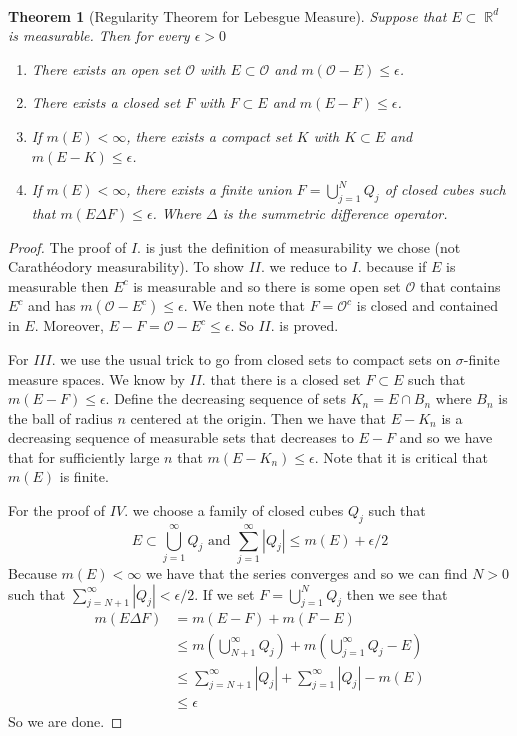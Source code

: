 \documentclass{article}
\DeclareMathOperator{\R}{\mathbb{R}}
\newtheorem*{thm}{\\ Theorem}
\begin{document}
\begin{thm}[Regularity Theorem for Lebesgue Measure]
  Suppose that $E \subset \R^d$ is measurable. Then for every $\epsilon > 0$
  \begin{enumerate}
  \item[I.] There exists an open set $\mathcal{O}$ with $E
    \subset \mathcal{O}$ and $m(\mathcal{O} - E) \leq \epsilon$.
  \item[II.] There exists a closed set $F$ with $F \subset E$ and $m(E-F)
    \leq \epsilon$.
  \item[III.] If $m(E) < \infty$, there exists a compact set $K$ with $K
    \subset E$ and $m(E-K) \leq \epsilon$.
  \item[IV.] If $m(E) < \infty$, there exists a finite union $F =
    \bigcup_{j=1}^N Q_j$ of closed cubes such that $m(E\Delta F) \leq
    \epsilon$. Where $\Delta$ is the summetric difference operator.
  \end{enumerate}
\end{thm}
\begin{proof}
  The proof of $I.$ is just the definition of measurability we chose (not
  Carath\'{e}odory measurability). To show $II.$ we reduce to $I.$
  because if $E$ is measurable then $E^c$ is measurable and so there is some
  open set $\mathcal{O}$ that contains $E^c$ and has $m(\mathcal{O}-E^c)\leq
  \epsilon$. We then note that $F = \mathcal{O}^c$ is closed and contained in
  $E$. Moreover, $E-F = \mathcal{O} - E^c \leq \epsilon$. So $II.$ is proved.

  For $III.$ we use the usual trick to go from closed sets to compact sets on
  $\sigma$-finite measure spaces. We know by $II.$ that there is a closed set
  $F \subset E$ such that $m(E-F) \leq \epsilon$. Define the decreasing
  sequence of sets $K_n = E \cap B_n$ where $B_n$ is the ball of radius $n$
  centered at the origin. Then we have that $E - K_n$ is a decreasing
  sequence of measurable sets that decreases to $E - F$ and so we have that
  for sufficiently large $n$ that $m(E - K_n) \leq \epsilon$. Note that it is
  critical that $m(E)$ is finite.

  For the proof of $IV.$ we choose a family of closed cubes $Q_j$ such that
  \[
  E \subset \bigcup_{j=1}^\infty Q_j \text{ and } \sum_{j=1}^\infty |Q_j| \leq
  m(E) + \epsilon/2
  \]
  Because $m(E) < \infty$ we have that the series converges and so we can
  find $N > 0$ such that $\sum_{j=N+1}^\infty |Q_j| < \epsilon/2$. If we set
  $F = \bigcup_{j=1}^N Q_j$ then we see that
  \begin{align*}
    m(E\Delta F) &= m(E-F) + m(F-E) \\
    &\leq m\left( \bigcup_{N+1}^\infty Q_j\right) + m\left(\bigcup_{j=1}^\infty
      Q_j - E\right) \\
    &\leq \sum_{j=N+1}^\infty |Q_j| + \sum_{j=1}^\infty |Q_j| - m(E) \\
    &\leq \epsilon
  \end{align*}
  So we are done.
\end{proof}
\end{document}
